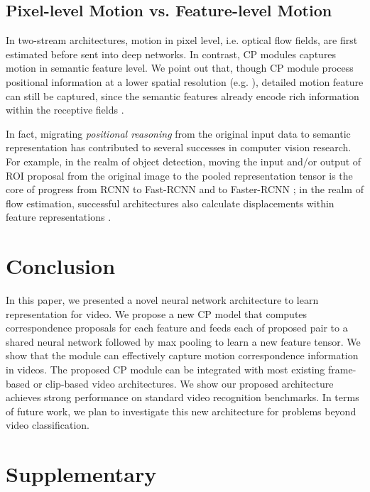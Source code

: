 \documentclass[10pt,twocolumn,letterpaper]{article}
\begin{document}
\subsection{Pixel-level Motion vs. Feature-level Motion}

In two-stream architectures, motion in pixel level, i.e. optical flow fields, are first estimated before sent into deep networks. 
In contrast, CP modules captures motion in semantic feature level. We point out that, though CP module process positional information at a lower spatial resolution (e.g. ), detailed motion feature can still be captured, since the semantic features already encode rich information within the receptive fields \cite{do:convnets:learn:correspondence}. 


In fact, migrating \textit{positional reasoning} from the original input data to semantic representation has contributed to several successes in computer vision research. 
For example, in the realm of object detection, moving the input and/or output of ROI proposal from the original image to the pooled representation tensor is the core of progress from RCNN \cite{RCNN} to Fast-RCNN \cite{Fast:RCNN} and to Faster-RCNN \cite{Faster:RCNN}; in the realm of flow estimation, successful architectures also calculate displacements within feature representations \cite{FlowNet,FlowNet2}.

\section{Conclusion}

In this paper, we presented a novel neural network architecture to learn representation for video. We propose a new CP model that computes  correspondence proposals for each feature and feeds each of proposed pair to a shared neural network followed by max pooling to learn a new feature tensor. We show that the module can effectively capture motion correspondence information in videos. The proposed CP module can be integrated with most existing 
frame-based or clip-based 
video architectures. 
We show our proposed architecture achieves strong performance on standard video recognition benchmarks. In terms of future work, we plan to investigate this new architecture for problems beyond video classification.

\newpage

{\small


}

 \section*{Supplementary}
\appendix
\end{document}

